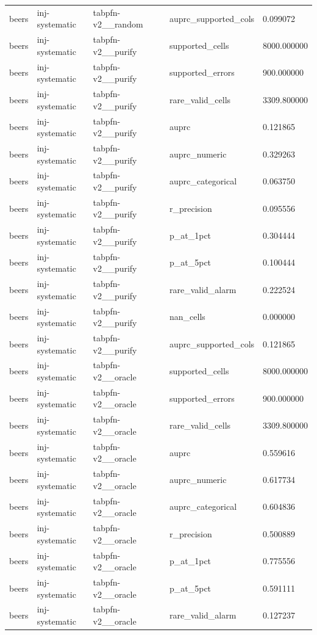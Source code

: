 \begin{tabular}{lllll}
beers & inj-systematic & tabpfn-v2\_\_random & auprc\_supported\_cols & 0.099072 \\
beers & inj-systematic & tabpfn-v2\_\_purify & supported\_cells & 8000.000000 \\
beers & inj-systematic & tabpfn-v2\_\_purify & supported\_errors & 900.000000 \\
beers & inj-systematic & tabpfn-v2\_\_purify & rare\_valid\_cells & 3309.800000 \\
beers & inj-systematic & tabpfn-v2\_\_purify & auprc & 0.121865 \\
beers & inj-systematic & tabpfn-v2\_\_purify & auprc\_numeric & 0.329263 \\
beers & inj-systematic & tabpfn-v2\_\_purify & auprc\_categorical & 0.063750 \\
beers & inj-systematic & tabpfn-v2\_\_purify & r\_precision & 0.095556 \\
beers & inj-systematic & tabpfn-v2\_\_purify & p\_at\_1pct & 0.304444 \\
beers & inj-systematic & tabpfn-v2\_\_purify & p\_at\_5pct & 0.100444 \\
beers & inj-systematic & tabpfn-v2\_\_purify & rare\_valid\_alarm & 0.222524 \\
beers & inj-systematic & tabpfn-v2\_\_purify & nan\_cells & 0.000000 \\
beers & inj-systematic & tabpfn-v2\_\_purify & auprc\_supported\_cols & 0.121865 \\
beers & inj-systematic & tabpfn-v2\_\_oracle & supported\_cells & 8000.000000 \\
beers & inj-systematic & tabpfn-v2\_\_oracle & supported\_errors & 900.000000 \\
beers & inj-systematic & tabpfn-v2\_\_oracle & rare\_valid\_cells & 3309.800000 \\
beers & inj-systematic & tabpfn-v2\_\_oracle & auprc & 0.559616 \\
beers & inj-systematic & tabpfn-v2\_\_oracle & auprc\_numeric & 0.617734 \\
beers & inj-systematic & tabpfn-v2\_\_oracle & auprc\_categorical & 0.604836 \\
beers & inj-systematic & tabpfn-v2\_\_oracle & r\_precision & 0.500889 \\
beers & inj-systematic & tabpfn-v2\_\_oracle & p\_at\_1pct & 0.775556 \\
beers & inj-systematic & tabpfn-v2\_\_oracle & p\_at\_5pct & 0.591111 \\
beers & inj-systematic & tabpfn-v2\_\_oracle & rare\_valid\_alarm & 0.127237 \\

\end{tabular}
